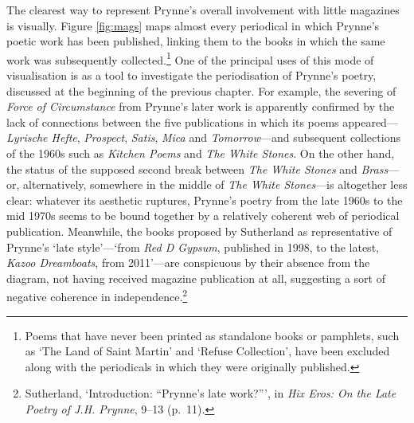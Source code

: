 \documentclass[]{article}
\begin{document}
The clearest way to represent Prynne’s overall involvement with little
magazines is visually. Figure \ref{fig:mags} maps almost every
periodical in which Prynne’s poetic work has been published, linking
them to the books in which the same work was subsequently
collected.\footnote{Poems that have never been printed as standalone
  books or pamphlets, such as ‘The Land of Saint Martin’ and ‘Refuse
  Collection’, have been excluded along with the periodicals in which
  they were originally published.} One of the principal uses of this
mode of visualisation is as a tool to investigate the periodisation of
Prynne’s poetry, discussed at the beginning of the previous chapter. For
example, the severing of \emph{Force of Circumstance} from Prynne’s
later work is apparently confirmed by the lack of connections between
the five publications in which its poems appeared—\emph{Lyrische Hefte},
\emph{Prospect}, \emph{Satis}, \emph{Mica} and \emph{Tomorrow}—and
subsequent collections of the 1960s such as \emph{Kitchen Poems} and
\emph{The White Stones}. On the other hand, the status of the supposed
second break between \emph{The White Stones} and \emph{Brass}—or,
alternatively, somewhere in the middle of \emph{The White Stones}—is
altogether less clear: whatever its aesthetic ruptures, Prynne’s poetry
from the late 1960s to the mid 1970s seems to be bound together by a
relatively coherent web of periodical publication. Meanwhile, the books
proposed by Sutherland as representative of Prynne’s ‘late style’—‘from
\emph{Red D Gypsum}, published in 1998, to the latest, \emph{Kazoo
Dreamboats}, from 2011’—are conspicuous by their absence from the
diagram, not having received magazine publication at all, suggesting a
sort of negative coherence in independence.\footnote{Sutherland,
  ‘Introduction: “Prynne’s late work?”’, in \emph{Hix Eros: On the Late
  Poetry of J.H. Prynne}, 9–13 (p.~11).}
\end{document}
